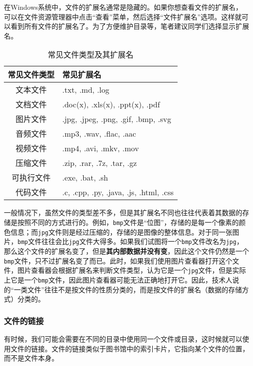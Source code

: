 在Windows系统中，文件的扩展名通常是隐藏的。如果你想查看文件的扩展名，可以在文件资源管理器中点击“查看”菜单，然后选择“文件扩展名”选项。这样就可以看到所有文件的扩展名了。为了方便维护目录等，笔者建议同学们选择显示扩展名。

\begin{table}[ht]
  \centering
  \begin{tabular}{c|l}
    \toprule
    常见文件类型 & 常见扩展名 \\
    \midrule
    文本文件 & .txt, .md, .log \\
    文档文件 & .doc(x), .xls(x), .ppt(x), .pdf \\
    图片文件 & .jpg, .jpeg, .png, .gif, .bmp, .svg \\
    音频文件 & .mp3, .wav, .flac, .aac \\
    视频文件 & .mp4, .avi, .mkv, .mov \\
    压缩文件 & .zip, .rar, .7z, .tar, .gz \\
    可执行文件 & .exe, .bat, .sh \\
    代码文件 & .c, .cpp, .py, .java, .js, .html, .css \\
    \bottomrule
  \end{tabular}
  \caption{常见文件类型及其扩展名}
  \label{tab:file-extensions}
\end{table}

一般情况下，虽然文件的类型差不多，但是其扩展名不同也往往代表着其数据的存储是按照不同的方式进行的。例如，\texttt{bmp}文件是“位图”，存储的是每一个像素的颜色信息；而\texttt{jpg}文件则是经过压缩的，存储的是图像的整体信息。对于同一张图片，\texttt{bmp}文件往往会比\texttt{jpg}文件大得多。如果我们试图将一个\texttt{bmp}文件改名为\texttt{jpg}，那么这个文件的扩展名变了，但是\textbf{其内部数据并没有变}，因此这个文件仍然是一个\texttt{bmp}文件，只不过扩展名变了而已。此时，如果我们使用图片查看器打开这个文件，图片查看器会根据扩展名来判断文件类型，认为它是一个\texttt{jpg}文件，但是实际上它是一个\texttt{bmp}文件，因此图片查看器可能无法正确地打开它。因此，技术人说的“一类文件”往往不是按文件的性质分类的，而是按文件的扩展名（数据的存储方式）分类的。

\subsubsection{文件的链接}

有时候，我们可能会需要在不同的目录中使用同一个文件或目录，这时候就可以使用文件的链接。文件的链接类似于图书馆中的索引卡片，它指向某个文件的位置，而不是文件本身。

